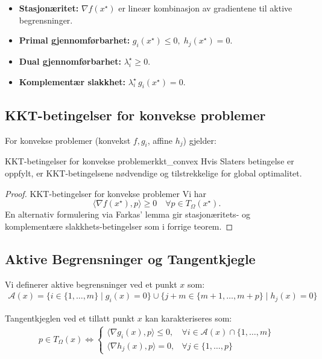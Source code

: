 \begin{itemize}
	\item \textbf{Stasjonæritet:} \(\nabla f(x^\star)\) er lineær kombinasjon av gradientene til aktive begrensninger.
	\item \textbf{Primal gjennomførbarhet:} \(g_i(x^\star)\le0,\;h_j(x^\star)=0\).
	\item \textbf{Dual gjennomførbarhet:} \(\lambda_i^\star\ge0\).
	\item \textbf{Komplementær slakkhet:} \(\lambda_i^\star\,g_i(x^\star)=0\).
\end{itemize}

\subsection{KKT-betingelser for konvekse problemer}

For konvekse problemer (konvekst \(f,g_i\), affine \(h_j\)) gjelder:

\begin{theorem}{KKT-betingelser for konvekse problemer}{kkt_convex}
	Hvis Slaters betingelse er oppfylt, er KKT-betingelsene nødvendige og tilstrekkelige for global optimalitet.
\end{theorem}

\begin{proof}{KKT-betingelser for konvekse problemer}{}
	Vi har
	\[
		\langle\nabla f(x^\star), p\rangle \ge0
		\quad\forall p\in T_\Omega(x^\star).
	\]
	En alternativ formulering via Farkas’ lemma gir stasjonæritets- og komplementære slakkhets-betingelser som i forrige teorem.
\end{proof}

\subsection{Aktive Begrensninger og Tangentkjegle}

Vi definerer aktive begrensninger ved et punkt $x$ som:
\begin{align*}
	\mathcal{A}(x) = \{i \in \{1,\ldots,m\} \mid g_i(x) = 0\} \cup \{j+m \in \{m+1,\ldots,m+p\} \mid h_j(x) = 0\}
\end{align*}

Tangentkjeglen ved et tillatt punkt $x$ kan karakteriseres som:
\begin{align*}
	p \in T_{\Omega}(x) \Longleftrightarrow
	\begin{cases}
		\langle \nabla g_i(x), p \rangle \leq 0, & \forall i \in \mathcal{A}(x) \cap \{1,\ldots,m\} \\
		\langle \nabla h_j(x), p \rangle = 0,    & \forall j \in \{1,\ldots,p\}
	\end{cases}
\end{align*}

